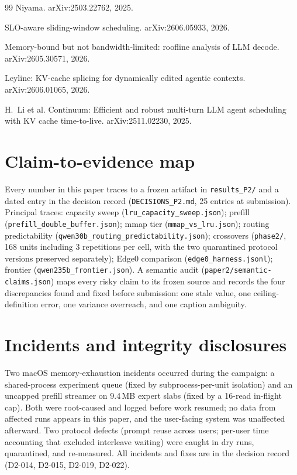 \documentclass[11pt]{article}
\begin{document}
\begin{thebibliography}{99}
 Niyama. arXiv:2503.22762, 2025.

 SLO-aware sliding-window scheduling. arXiv:2606.05933, 2026.

 Memory-bound but not bandwidth-limited: roofline analysis
of LLM decode. arXiv:2605.30571, 2026.

 Leyline: KV-cache splicing for dynamically edited agentic
contexts. arXiv:2606.01065, 2026.

 H.~Li et al. Continuum: Efficient and robust multi-turn
LLM agent scheduling with KV cache time-to-live. arXiv:2511.02230, 2025.

\end{thebibliography}

\appendix

\section{Claim-to-evidence map}
Every number in this paper traces to a frozen artifact in
\texttt{results\_P2/} and a dated entry in the decision record
(\texttt{DECISIONS\_P2.md}, 25 entries at submission). Principal traces:
capacity sweep (\texttt{lru\_capacity\_sweep.json}); prefill
(\texttt{prefill\_double\_buffer.json}); mmap tier
(\texttt{mmap\_vs\_lru.json}); routing predictability
(\texttt{qwen30b\_routing\_predictability.json}); crossovers
(\texttt{phase2/}, 168 units including 3 repetitions per cell, with the
two quarantined protocol versions preserved separately); Edge0 comparison
(\texttt{edge0\_harness.jsonl}); frontier (\texttt{qwen235b\_frontier.json}).
A semantic audit (\texttt{paper2/semantic-claims.json}) maps every risky
claim to its frozen source and records the four discrepancies found and
fixed before submission: one stale value, one ceiling-definition error, one
variance overreach, and one caption ambiguity.

\section{Incidents and integrity disclosures}
Two macOS memory-exhaustion incidents occurred during the campaign: a
shared-process experiment queue (fixed by subprocess-per-unit isolation) and
an uncapped prefill streamer on 9.4\,MB expert slabs (fixed by a 16-read
in-flight cap). Both were root-caused and logged before work resumed; no
data from affected runs appears in this paper, and the user-facing system
was unaffected afterward. Two protocol defects (prompt reuse across users;
per-user time accounting that excluded interleave waiting) were caught in
dry runs, quarantined, and re-measured. All incidents and fixes are in the
decision record (D2-014, D2-015, D2-019, D2-022).
\end{document}
